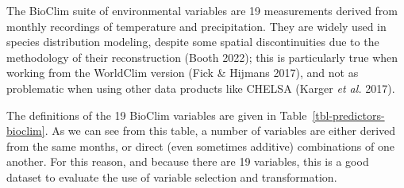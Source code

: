 \documentclass[
  letterpaper,
]{scrbook}
\begin{document}
The BioClim suite of environmental variables are 19 measurements derived
from monthly recordings of temperature and precipitation. They are
widely used in species distribution modeling, despite some spatial
discontinuities due to the methodology of their reconstruction (Booth
2022); this is particularly true when working from the WorldClim version
(Fick \& Hijmans 2017), and not as problematic when using other data
products like CHELSA (Karger \emph{et al.} 2017).

The definitions of the 19 BioClim variables are given in
Table~\ref{tbl-predictors-bioclim}. As we can see from this table, a
number of variables are either derived from the same months, or direct
(even sometimes additive) combinations of one another. For this reason,
and because there are 19 variables, this is a good dataset to evaluate
the use of variable selection and transformation.
\end{document}
